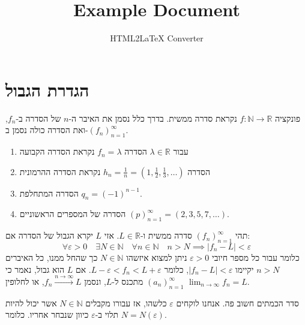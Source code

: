 \documentclass{tstextbook}
\begin{document}
\title{Example Document}
\author{HTML2LaTeX Converter}
\maketitle


\section{הגדרת הגבול}

\begin{definition}
פונקציה \(f:\mathbb{N}\to \mathbb{R}\) נקראת סדרה ממשית. בדרך כלל נסמן את האיבר ה-\(n\) של הסדרה ב-\(f_{n}\), ואת הסדרה כולה נסמן ב-\((f_{n})_{n=1}^{\infty}\).

\end{definition}
\begin{example}
  \begin{enumerate}
    \item עבור \(\lambda \in \mathbb{R}\) הסדרה \(f_{n}=\lambda\) נקראת הסדרה הקבועה 


    \item הסדרה \(h_{n}=\frac{1}{n}=\left( 1,\frac{1}{2},\frac{1}{3},\dots \right)\) נקראת הסדרה ההרמונית 


    \item הסדרה המתחלפת \(q_{n}=(-1)^{n-1}\).  


    \item הסדרה של המספרים הראשוניים \((p)_{n=1}^{\infty}=\left( 2,3,5,7,\dots \right)\). 


  \end{enumerate}
\end{example}
\begin{definition}
תהי \((f_{n})_{n=1}^{\infty}\) סדרה ממשית ו-\(L \in \mathbb{R}\). אזי \(L\) יקרא הגבול של הסדרה אם:
$$\forall\varepsilon>0\quad \exists N \in \mathbb{N}\quad \forall n\in \mathbb{N}\quad n>N\implies |f_{n}-L|<\varepsilon$$
כלומר עבור כל מספר חיובי \(\varepsilon>0\) ניתן למצוא איזשהו \(N \in \mathbb{N}\) כך שהחל ממנו, כל האיברים \(n>N\) יקיימו \(|f_{n}-L|<\varepsilon\), כלומר \(L-\varepsilon<f_{n}<L+\varepsilon\).
אם \(L\) הוא גבול, נאמר כי \((a_n)_{n=1}^\infty\) מתכנס ל-\(L\), ונסמן \(f_{n}\xrightarrow{n\to \infty}L\), או לחלופין \(\lim_{ n \to \infty }f_{n}=L\).

\end{definition}
\begin{remark}
סדר הכמתים חשוב פה. אנחנו לוקחים \(\varepsilon\) כלשהו, אז עבורו מקבלים \(N\in \mathbb{N}\) אשר יכול להיות תלוי ב-\(\varepsilon\) כיוון שנבחר אחריו. כלומר \(N=N\left( \varepsilon \right)\).

\end{remark}
\end{document}
